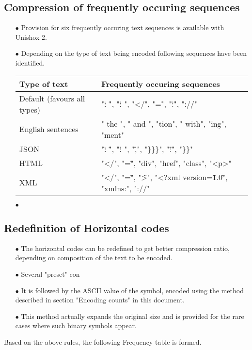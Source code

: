 \documentclass[]{article}
\begin{document}
\subsection{Compression of frequently occuring sequences}
\begin{itemize}
	\item[$\bullet$] Provision for six frequently occuring text sequences is available with Unishox 2.
	\item[$\bullet$] Depending on the type of text being encoded following sequences have been identified.
	\item[] \begin{tabular}{ | l | l |} \hline
		﻿\textbf{Type of text} & ﻿\textbf{Frequently occuring sequences} \\ \hline
		Default (favours all types) & "\": \"", "\": ", "</", "=\"", "\":\"", "://" \\ \hline
		English sentences & " the ", " and ", "tion", " with", "ing", "ment" \\ \hline
		JSON & "\": \"", "\": ", "\",", "\}\}\}", "\":\"", "\}\}" \\ \hline
		HTML & "</", "=\"", "div", "href", "class", "<p>" \\ \hline
		XML & "</", "=\"", "\">", "<?xml version=\"1.0\"", "xmlns:", "://" \\ \hline
		\end{tabular}
	\item[$\bullet$] 
\end{itemize}

\subsection{Redefinition of Horizontal codes}
\begin{itemize}
	\item[$\bullet$] The horizontal codes can be redefined to get better compression ratio, depending on composition of the text to be encoded.
	\item[$\bullet$] Several "preset" con
	\item[$\bullet$] It is followed by the ASCII value of the symbol, encoded using the method described in section "Encoding counts" in this document.
	\item[$\bullet$] This method actually expands the original size and is provided for the rare cases where such binary symbols appear.
\end{itemize}


Based on the above rules, the following Frequency table is formed.
\end{document}
